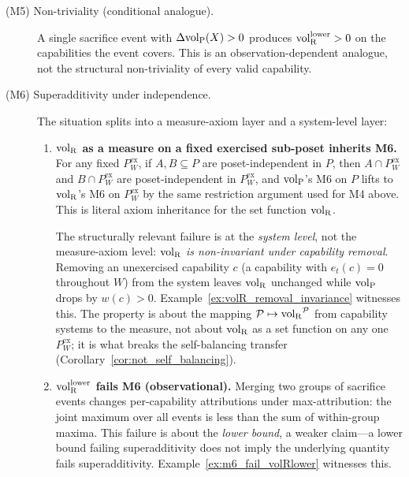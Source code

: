 \begin{theorem}
\begin{description}
\item[(M5) Non-triviality (conditional analogue).] A single
  sacrifice event with $\Delta{\operatorname{vol}_{\mathrm{P}}}(X) > 0$ produces
  ${\operatorname{vol}_{\mathrm{R}}^{\mathrm{lower}}} > 0$ on the capabilities the event covers.  This
  is an observation-dependent analogue, not the structural
  non-triviality of every valid capability.

\item[(M6) Superadditivity under independence.]
  The situation splits into a measure-axiom layer and a
  system-level layer:
  \begin{enumerate}
  \item[(a)] \textbf{${\operatorname{vol}_{\mathrm{R}}}$ as a measure on a fixed exercised
    sub-poset inherits M6.}
    For any fixed $P^{\mathrm{ex}}_W$, if $A, B \subseteq P$ are
    poset-independent in $P$, then $A \cap P^{\mathrm{ex}}_W$
    and $B \cap P^{\mathrm{ex}}_W$ are poset-independent in
    $P^{\mathrm{ex}}_W$, and ${\operatorname{vol}_{\mathrm{P}}}$'s M6 on $P$ lifts to
    ${\operatorname{vol}_{\mathrm{R}}}$'s M6 on $P^{\mathrm{ex}}_W$ by the same restriction
    argument used for M4 above.  This is literal axiom
    inheritance for the set function ${\operatorname{vol}_{\mathrm{R}}}$.

    The structurally relevant failure is at the
    \emph{system level}, not the measure-axiom level:
    \emph{${\operatorname{vol}_{\mathrm{R}}}$ is non-invariant under capability removal}.
    Removing an unexercised capability $c$ (a capability with
    $e_t(c) = 0$ throughout $W$) from the system leaves
    ${\operatorname{vol}_{\mathrm{R}}}$ unchanged while ${\operatorname{vol}_{\mathrm{P}}}$ drops by $w(c) > 0$.
    Example~\ref{ex:volR_removal_invariance} witnesses this.
    The property is about the mapping $\mathcal{P} \mapsto
    {\operatorname{vol}_{\mathrm{R}}}^{\mathcal{P}}$ from capability systems to the measure,
    not about ${\operatorname{vol}_{\mathrm{R}}}$ as a set function on any one
    $P^{\mathrm{ex}}_W$; it is what breaks the self-balancing
    transfer (Corollary~\ref{cor:not_self_balancing}).
  \item[(b)] \textbf{${\operatorname{vol}_{\mathrm{R}}^{\mathrm{lower}}}$ fails M6 (observational).}
    Merging two groups of sacrifice events changes per-capability
    attributions under max-attribution: the joint maximum over
    all events is less than the sum of within-group maxima.  This
    failure is about the \emph{lower bound}, a weaker claim---a
    lower bound failing superadditivity does not imply the
    underlying quantity fails superadditivity.
    Example~\ref{ex:m6_fail_volRlower} witnesses this.
  \end{enumerate}
\end{description}
\end{theorem}

